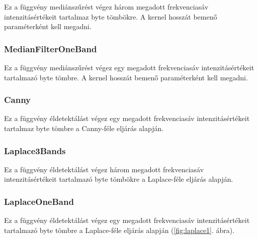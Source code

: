 \documentclass[a4paper,12pt]{article}
\begin{document}
Ez a függvény mediánszűrést végez három megadott frekvenciasáv intenzitásértékeit tartalmaz byte tömbökre. A kernel hosszát bemenő paraméterként kell megadni.

\subsubsection{MedianFilterOneBand}

Ez a függvény mediánszűrést végez egy megadott frekvenciasáv intenzitásértékeit tartalmazó byte tömbre. A kernel hosszát bemenő paraméterként kell megadni.


	
\subsubsection{Canny}

Ez a függvény éldetektálást végez egy megadott frekvenciasáv intenzitásértékeit tartalmaz byte tömbre a Canny-féle eljárás alapján.

\subsubsection{Laplace3Bands}

Ez a függvény éldetektálást végez három megadott frekvenciasáv intenzitásértékeit tartalmazó byte tömbökre a Laplace-féle eljárás alapján.

\subsubsection{LaplaceOneBand}

Ez a függvény éldetektálást végez egy megadott frekvenciasáv intenzitásértékeit tartalmazó byte tömbre a Laplace-féle eljárás alapján (\ref{fig:laplace1}. ábra).
\end{document}
